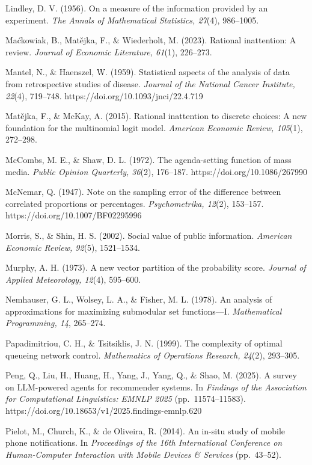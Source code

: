 \documentclass[
  11pt]{article}
\begin{document}
Lindley, D. V. (1956). On a measure of the information provided by an
experiment. \emph{The Annals of Mathematical Statistics, 27}(4),
986--1005.

Maćkowiak, B., Matějka, F., \& Wiederholt, M. (2023). Rational
inattention: A review. \emph{Journal of Economic Literature, 61}(1),
226--273.

Mantel, N., \& Haenszel, W. (1959). Statistical aspects of the analysis
of data from retrospective studies of disease. \emph{Journal of the
National Cancer Institute, 22}(4), 719--748.
https://doi.org/10.1093/jnci/22.4.719

Matějka, F., \& McKay, A. (2015). Rational inattention to discrete
choices: A new foundation for the multinomial logit model.
\emph{American Economic Review, 105}(1), 272--298.

McCombs, M. E., \& Shaw, D. L. (1972). The agenda-setting function of
mass media. \emph{Public Opinion Quarterly, 36}(2), 176--187.
https://doi.org/10.1086/267990

McNemar, Q. (1947). Note on the sampling error of the difference between
correlated proportions or percentages. \emph{Psychometrika, 12}(2),
153--157. https://doi.org/10.1007/BF02295996

Morris, S., \& Shin, H. S. (2002). Social value of public information.
\emph{American Economic Review, 92}(5), 1521--1534.

Murphy, A. H. (1973). A new vector partition of the probability score.
\emph{Journal of Applied Meteorology, 12}(4), 595--600.

Nemhauser, G. L., Wolsey, L. A., \& Fisher, M. L. (1978). An analysis of
approximations for maximizing submodular set functions---I.
\emph{Mathematical Programming, 14}, 265--274.

Papadimitriou, C. H., \& Tsitsiklis, J. N. (1999). The complexity of
optimal queueing network control. \emph{Mathematics of Operations
Research, 24}(2), 293--305.

Peng, Q., Liu, H., Huang, H., Yang, J., Yang, Q., \& Shao, M. (2025). A
survey on LLM-powered agents for recommender systems. In \emph{Findings
of the Association for Computational Linguistics: EMNLP 2025}
(pp.~11574--11583). https://doi.org/10.18653/v1/2025.findings-emnlp.620

Pielot, M., Church, K., \& de Oliveira, R. (2014). An in-situ study of
mobile phone notifications. In \emph{Proceedings of the 16th
International Conference on Human-Computer Interaction with Mobile
Devices \& Services} (pp.~43--52).
\end{document}
